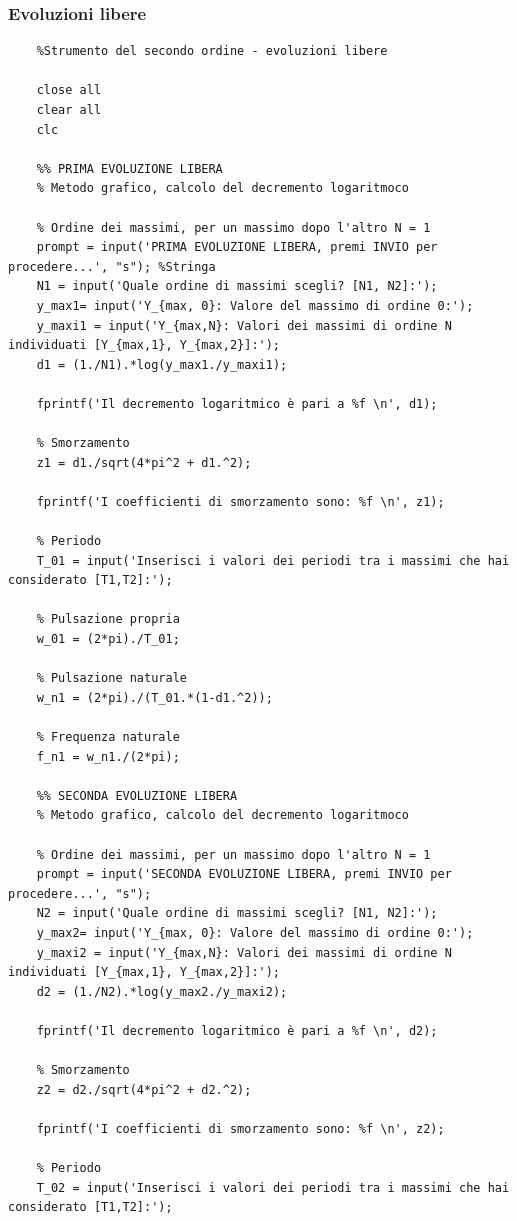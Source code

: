 \documentclass[a4paper, 12pt, twoside]{report}
\begin{document}
\subsubsection{Evoluzioni libere}
 \footnotesize
\begin{verbatim}
	%Strumento del secondo ordine - evoluzioni libere
		
	close all
	clear all
	clc
	
	%% PRIMA EVOLUZIONE LIBERA
	% Metodo grafico, calcolo del decremento logaritmoco
	
	% Ordine dei massimi, per un massimo dopo l'altro N = 1
	prompt = input('PRIMA EVOLUZIONE LIBERA, premi INVIO per procedere...', "s"); %Stringa
	N1 = input('Quale ordine di massimi scegli? [N1, N2]:');
	y_max1= input('Y_{max, 0}: Valore del massimo di ordine 0:');
	y_maxi1 = input('Y_{max,N}: Valori dei massimi di ordine N individuati [Y_{max,1}, Y_{max,2}]:'); 
	d1 = (1./N1).*log(y_max1./y_maxi1);
	
	fprintf('Il decremento logaritmico è pari a %f \n', d1);
	
	% Smorzamento
	z1 = d1./sqrt(4*pi^2 + d1.^2);
	
	fprintf('I coefficienti di smorzamento sono: %f \n', z1);
	
	% Periodo
	T_01 = input('Inserisci i valori dei periodi tra i massimi che hai considerato [T1,T2]:');
	
	% Pulsazione propria 
	w_01 = (2*pi)./T_01;
	
	% Pulsazione naturale
	w_n1 = (2*pi)./(T_01.*(1-d1.^2));
	
	% Frequenza naturale 
	f_n1 = w_n1./(2*pi);
	
	%% SECONDA EVOLUZIONE LIBERA
	% Metodo grafico, calcolo del decremento logaritmoco
	
	% Ordine dei massimi, per un massimo dopo l'altro N = 1
	prompt = input('SECONDA EVOLUZIONE LIBERA, premi INVIO per procedere...', "s");
	N2 = input('Quale ordine di massimi scegli? [N1, N2]:');
	y_max2= input('Y_{max, 0}: Valore del massimo di ordine 0:');
	y_maxi2 = input('Y_{max,N}: Valori dei massimi di ordine N individuati [Y_{max,1}, Y_{max,2}]:'); 
	d2 = (1./N2).*log(y_max2./y_maxi2);
	
	fprintf('Il decremento logaritmico è pari a %f \n', d2);
	
	% Smorzamento
	z2 = d2./sqrt(4*pi^2 + d2.^2);
	
	fprintf('I coefficienti di smorzamento sono: %f \n', z2);
	
	% Periodo
	T_02 = input('Inserisci i valori dei periodi tra i massimi che hai considerato [T1,T2]:');
	

\end{verbatim}
\end{document}
